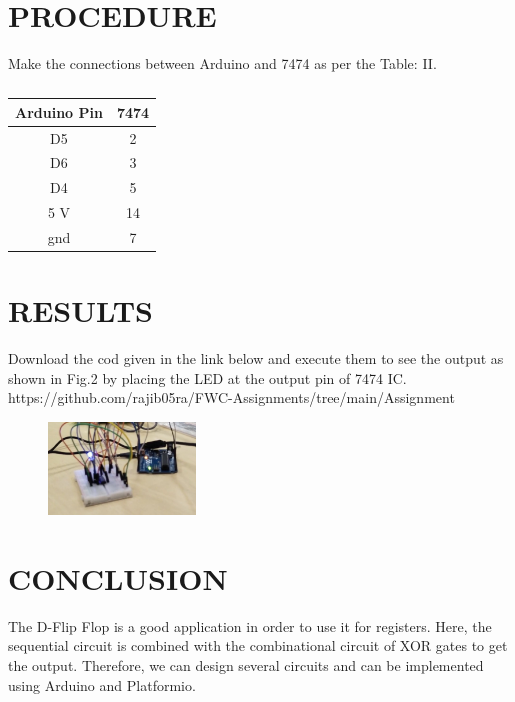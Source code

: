\documentclass[conference]{IEEEtran}
\begin{document}
\section{PROCEDURE}
Make the connections between Arduino and 7474 as per the Table: II.
 \begin{table}[htbp]                                       
\centering                                                          
\begin{tabular}{| c | c |} \hline                                
	\textbf{Arduino Pin} & \textbf{7474}  \\\hline 
D5 & 2  \\ \hline                                             
D6 &  3 \\ \hline                                               
D4 & 5 \\ \hline                                           
5 V  & 14 \\ \hline                                        
gnd  & 7 \\                                                   
\hline                                                               
\end{tabular}                                                        
\vspace{0.1cm}                                                       
\caption{\label{tab:widgets}}                                       
\end{table}
\section{RESULTS}
Download the cod given in the link below and execute them to see the output as shown in Fig.2 by placing the LED at the output pin of 7474 IC. 
https://github.com/rajib05ra/FWC-Assignments/tree/main/Assignment%
\begin{figure}[h] 
	\centering 
	\includegraphics[width=0.35\textwidth]{IMG-20241021-WA0009}
	\caption{\label{fig:Gates}}    
\end{figure}
\section{CONCLUSION}
The D-Flip Flop is a good application in order to use it for registers. Here, the sequential circuit is combined with the combinational circuit of XOR gates to get the output. Therefore, we can design several circuits and can be implemented using Arduino and Platformio.
\end{document}
